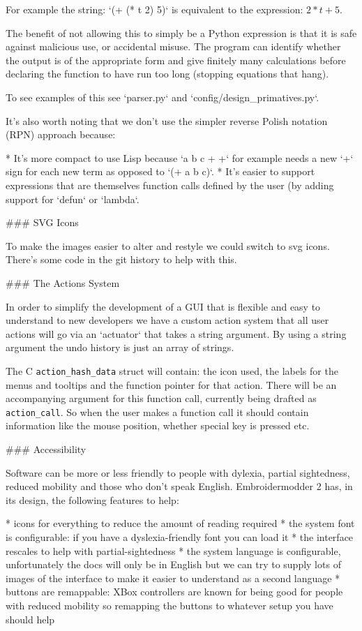 For example the string: `(+ (* t 2) 5)` is equivalent to the expression: $2*t + 5$.

The benefit of not allowing this to simply be a Python expression
is that it is safe against malicious use, or accidental misuse.
The program can identify whether the output is of the appropriate
form and give finitely many calculations before declaring the
function to have run too long (stopping equations that hang).

To see examples of this see `parser.py` and `config/design\_primatives.py`.

It's also worth noting that we don't use the simpler reverse Polish
notation (RPN) approach because:

* It's more compact to use Lisp because `a b c + +` for example needs a new `+` sign for each new term as opposed to `(+ a b c)`.
* It's easier to support expressions that are themselves function calls defined by the user (by adding support for `defun` or `lambda`.

### SVG Icons

To make the images easier to alter and restyle we could switch to svg icons. There's some code in the
git history to help with this.

### The Actions System

In order to simplify the development of a GUI that is flexible and
easy to understand to new developers we have a custom action system that all
user actions will go via an `actuator` that takes a string argument. By using a
string argument the undo history is just an array of strings.

The C \texttt{action\_hash\_data} struct will contain: the icon used, the labels for the
menus and tooltips and the function pointer for that action.
There will be an accompanying argument for this function call, currently being
drafted as \texttt{action\_call}. So when the user makes a function call it should
contain information like the mouse position, whether special key is pressed
etc.

### Accessibility

Software can be more or less friendly to people with dylexia, partial sightedness,
reduced mobility and those who don't speak English.
Embroidermodder 2 has, in its design, the following features to help:

* icons for everything to reduce the amount of reading required
* the system font is configurable: if you have a dyslexia-friendly font you can load it
* the interface rescales to help with partial-sightedness
* the system language is configurable, unfortunately the docs will only be in English but we can try to supply lots of images of the interface to make it easier to understand as a second language
* buttons are remappable: XBox controllers are known for being good for people with reduced mobility so remapping the buttons to whatever setup you have should help

